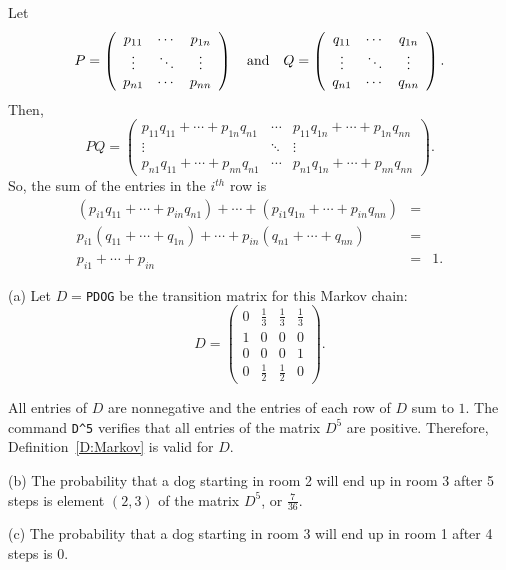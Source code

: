 \documentclass{ximera}
\begin{document}
Let
\[
P = \left(\begin{array}{ccc} p_{11} & \cdots & p_{1n} \\
\vdots & \ddots & \vdots \\ p_{n1} & \cdots & p_{nn}
\end{array}\right) \quad\mbox{and}\quad Q = \left(\begin{array}{ccc} q_{11} &
\cdots & q_{1n} \\ \vdots & \ddots & \vdots \\ q_{n1} & \cdots
& q_{nn} \end{array}\right).
\]
Then,
\[
PQ = \left(\begin{array}{ccc} p_{11}q_{11} + \cdots + p_{1n}q_{n1}
& \cdots & p_{11}q_{1n} + \cdots + p_{1n}q_{nn} \\
\vdots & \ddots & \vdots \\ p_{n1}q_{11} + \cdots + p_{nn}q_{n1}
& \cdots & p_{n1}q_{1n} + \cdots + p_{nn}q_{nn} \end{array}\right).
\]
So, the sum of the entries in the $i^{th}$ row is
\[
\begin{array}{rcl}
(p_{i1}q_{11} + \cdots + p_{in}q_{n1}) + \cdots + (p_{i1}q_{1n} +
\cdots + p_{in}q_{nn}) & = & \\
p_{i1}(q_{11} + \cdots + q_{1n}) + \cdots + p_{in}(q_{n1} +
\cdots + q_{nn}) & = & \\ p_{i1} + \cdots + p_{in} & = & 1.
\end{array}
\]

(a) \ans Let $D =${\tt PDOG} be the transition matrix for this Markov chain:
\[
D = \left(\begin{array}{rrrr} 0 & \frac{1}{3} & \frac{1}{3} &
\frac{1}{3} \\ 1 & 0 & 0 & 0 \\ 0 & 0 & 0 & 1 \\
0 & \frac{1}{2} & \frac{1}{2} & 0 \end{array}\right).
\]

\soln All entries of $D$ are nonnegative and the entries of each row of
$D$ sum to $1$.  The \Matlab command {\tt D\^{}5} verifies that all
entries of the matrix $D^5$ are positive.  Therefore,
Definition~\ref{D:Markov} is valid for $D$.

(b) The probability that a dog starting in room 2 will end up in room
3 after 5 steps is element $(2,3)$ of the matrix $D^5$, or
$\frac{7}{36}$.

(c) \ans The probability that a dog starting in room 3 will end up in room
1 after 4 steps is 0.
\end{document}
